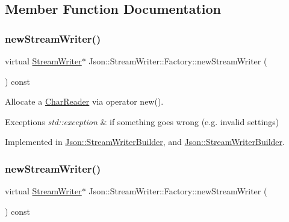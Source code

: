 \subsection{Member Function Documentation}
\hypertarget{class_json_1_1_stream_writer_1_1_factory_a9d30ec53e8288cd53befccf1009c5f31}{}\label{class_json_1_1_stream_writer_1_1_factory_a9d30ec53e8288cd53befccf1009c5f31} 
\subsubsection{\texorpdfstring{new\+Stream\+Writer()}{newStreamWriter()}\hspace{0.1cm}{\footnotesize\ttfamily [1/2]}}
{\footnotesize\ttfamily virtual \hyperlink{class_json_1_1_stream_writer}{Stream\+Writer}$\ast$ Json\+::\+Stream\+Writer\+::\+Factory\+::new\+Stream\+Writer (\begin{DoxyParamCaption}{ }\end{DoxyParamCaption}) const\hspace{0.3cm}{\ttfamily [pure virtual]}}



Allocate a \hyperlink{class_json_1_1_char_reader}{Char\+Reader} via operator new(). 


\begin{DoxyExceptions}{Exceptions}
{\em std\+::exception} & if something goes wrong (e.\+g. invalid settings) \\
\hline
\end{DoxyExceptions}


Implemented in \hyperlink{class_json_1_1_stream_writer_builder_ab9ee278609f88ae04a7c1a84e1f559e6}{Json\+::\+Stream\+Writer\+Builder}, and \hyperlink{class_json_1_1_stream_writer_builder_a7ed17f52a139202a7bebc85bc79cbca3}{Json\+::\+Stream\+Writer\+Builder}.

\hypertarget{class_json_1_1_stream_writer_1_1_factory_a9d30ec53e8288cd53befccf1009c5f31}{}\label{class_json_1_1_stream_writer_1_1_factory_a9d30ec53e8288cd53befccf1009c5f31} 
\subsubsection{\texorpdfstring{new\+Stream\+Writer()}{newStreamWriter()}\hspace{0.1cm}{\footnotesize\ttfamily [2/2]}}
{\footnotesize\ttfamily virtual \hyperlink{class_json_1_1_stream_writer}{Stream\+Writer}$\ast$ Json\+::\+Stream\+Writer\+::\+Factory\+::new\+Stream\+Writer (\begin{DoxyParamCaption}{ }\end{DoxyParamCaption}) const\hspace{0.3cm}{\ttfamily [pure virtual]}}



